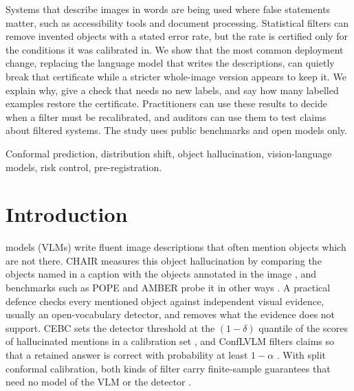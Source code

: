 \documentclass[journal]{IEEEtran}
\theoremstyle{remark}\newtheorem{remark}{Remark}
\begin{document}
\begin{IEEEImpStatement}
Systems that describe images in words are being used where false statements matter, such as accessibility tools and document processing. Statistical filters can remove invented objects with a stated error rate, but the rate is certified only for the conditions it was calibrated in. We show that the most common deployment change, replacing the language model that writes the descriptions, can quietly break that certificate while a stricter whole-image version appears to keep it. We explain why, give a check that needs no new labels, and say how many labelled examples restore the certificate. Practitioners can use these results to decide when a filter must be recalibrated, and auditors can use them to test claims about filtered systems. The study uses public benchmarks and open models only.
\end{IEEEImpStatement}

\begin{IEEEkeywords}
Conformal prediction, distribution shift, object hallucination, vision-language models, risk control, pre-registration.
\end{IEEEkeywords}

\section{Introduction}\label{sec:intro}
 models (VLMs) write fluent image descriptions that often mention objects which are not there. CHAIR measures this object hallucination by comparing the objects named in a caption with the objects annotated in the image \cite{rohrbach2018chair}, and benchmarks such as POPE and AMBER probe it in other ways \cite{li2023pope,wang2023amber}. A practical defence checks every mentioned object against independent visual evidence, usually an open-vocabulary detector, and removes what the evidence does not support. CEBC sets the detector threshold at the $(1-\delta)$ quantile of the scores of hallucinated mentions in a calibration set \cite{cebc}, and ConfLVLM filters claims so that a retained answer is correct with probability at least $1-\alpha$ \cite{conflvlm}. With split conformal calibration, both kinds of filter carry finite-sample guarantees that need no model of the VLM or the detector \cite{vovk2005algorithmic,angelopoulos2023gentle}.
\end{document}
